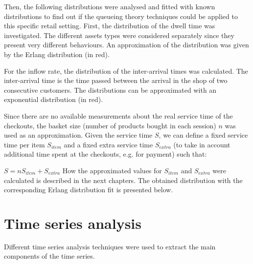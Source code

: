 Then, the following distributions were analysed and fitted with known distributions to find out if the queueing theory techniques could be applied to this specific retail setting.
First, the distribution of the dwell time was investigated. The different assets types were considered separately since they present very different behaviours. An approximation of the distribution was given by the Erlang distribution (in red).

For the inflow rate, the distribution of the inter-arrival times was calculated. The inter-arrival time is the time passed between the arrival in the shop of two consecutive customers. The distributions can be approximated with an exponential distribution (in red).

Since there are no available measurements about the real service time of the checkouts, the basket size (number of products bought in each session) $ n $ was used as an approximation. Given the service time $ S $, we can define a fixed service time per item $ S_{item} $ and a fixed extra service time $ S_{extra} $ (to take in account additional time spent at the checkouts, e.g. for payment) such that:

$ S = n S_{item} + S_{extra} $
How the approximated values for $ S_{item} $ and $ S_{extra} $ were calculated is described in the next chapters.
The obtained distribution with the corresponding Erlang distribution fit is presented below.


\section{Time series analysis}
\label{sec:time_series_analysis}
Different time series analysis techniques were used to extract the main components of the time series.

